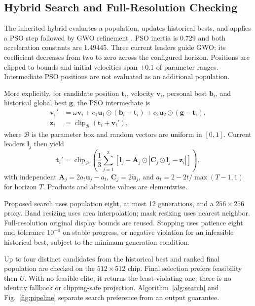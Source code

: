 \documentclass[conference]{IEEEtran}
\newcommand{\clip}{\operatorname{clip}}
\begin{document}
\subsection{Hybrid Search and Full-Resolution Checking}
The inherited hybrid evaluates a population, updates historical bests, and applies a PSO step followed by GWO refinement \cite{rentapalli2026,poli2007,mirjalili2014}. PSO inertia is 0.729 and both acceleration constants are 1.49445. Three current leaders guide GWO; its coefficient decreases from two to zero across the configured horizon. Positions are clipped to bounds and initial velocities span $\pm0.1$ of parameter ranges. Intermediate PSO positions are not evaluated as an additional population.

More explicitly, for candidate position $\mathbf t_i$, velocity $\mathbf v_i$, personal best $\mathbf b_i$, and historical global best $\mathbf g$, the PSO intermediate is
\begin{align}
\mathbf v_i'&=\omega\mathbf v_i+c_1\mathbf u_1\odot(\mathbf b_i-\mathbf t_i)
+c_2\mathbf u_2\odot(\mathbf g-\mathbf t_i),\\
\mathbf z_i&=\clip_{\mathcal B}(\mathbf t_i+\mathbf v_i'),
\end{align}
where $\mathcal B$ is the parameter box and random vectors are uniform in $[0,1]$. Current leaders $\mathbf l_j$ then yield
\begin{equation}
\mathbf t_i'=\clip_{\mathcal B}\left(\frac{1}{3}\sum_{j=1}^{3}
\left[\mathbf l_j-\mathbf A_j\odot|\mathbf C_j\odot\mathbf l_j-\mathbf z_i|\right]\right),
\end{equation}
with independent $\mathbf A_j=2a_t\mathbf u_j-a_t$, $\mathbf C_j=2\widetilde{\mathbf u}_j$, and $a_t=2-2t/\max(T-1,1)$ for horizon $T$. Products and absolute values are elementwise.

Proposed search uses population eight, at most 12 generations, and a $256\times256$ proxy. Band resizing uses area interpolation; mask resizing uses nearest neighbor. Full-resolution original display bounds are reused. Stopping uses patience eight and tolerance $10^{-4}$ on stable progress, or negative violation for an infeasible historical best, subject to the minimum-generation condition.

Up to four distinct candidates from the historical best and ranked final population are checked on the $512\times512$ chip. Final selection prefers feasibility then $U$. With no feasible elite, it returns the least-violating one; there is no identity fallback or clipping-safe projection. Algorithm~\ref{alg:search} and Fig.~\ref{fig:pipeline} separate search preference from an output guarantee.
\end{document}
